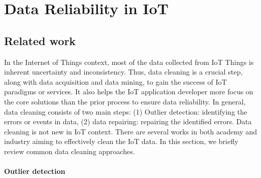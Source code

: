 
\section{Data Reliability in IoT}

\subsection{Related work}

In the Internet of Things context, most of the data collected from IoT Things is inherent uncertainty and inconsistency. Thus, data cleaning is a crucial step, along with data acquisition and data mining, to gain the success of IoT paradigms or services. It also helps the IoT application developer more focus on the core solutions than the prior process to ensure data reliability. In general, data cleaning consists of two main steps: (1) Outlier detection: identifying the errors or events in data, (2) data repairing: repairing the identified errors. Data cleaning is not new in IoT context. There are several works in both academy and industry aiming to effectively clean the IoT data. In this section, we briefly review common data cleaning approaches. 

\paragraph{Outlier detection}

